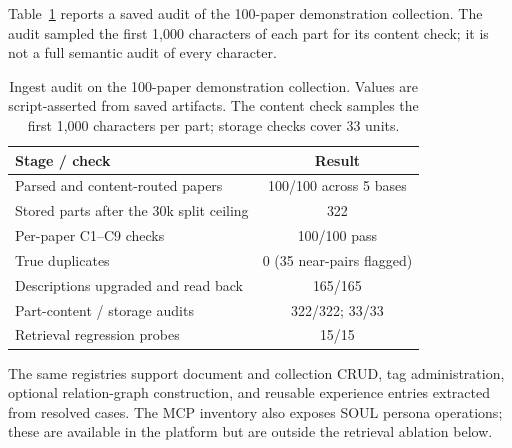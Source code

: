 Table~\ref{tab:pipeline} reports a saved audit of the 100-paper
demonstration collection. The audit sampled the first 1{,}000 characters
of each part for its content check; it is not a full semantic audit of
every character.

\begin{table}[t]
\caption{Ingest audit on the 100-paper demonstration collection. Values
are script-asserted from saved artifacts. The content check samples the
first 1{,}000 characters per part; storage checks cover 33 units.}
\label{tab:pipeline}
\footnotesize
\setlength{\tabcolsep}{3.5pt}
\begin{tabular}{@{}lc@{}}
\toprule
\textbf{Stage / check} & \textbf{Result} \\
\midrule
Parsed and content-routed papers & 100/100 across 5 bases \\
Stored parts after the 30k split ceiling & 322 \\
Per-paper C1--C9 checks & 100/100 pass \\
True duplicates & 0 (35 near-pairs flagged) \\
Descriptions upgraded and read back & 165/165 \\
Part-content / storage audits & 322/322; 33/33 \\
Retrieval regression probes & 15/15 \\
\bottomrule
\end{tabular}
\end{table}

The same registries support document and collection CRUD, tag
administration, optional relation-graph construction, and reusable
experience entries extracted from resolved cases. The MCP inventory
also exposes SOUL persona operations; these are available in the
platform but are outside the retrieval ablation below.

